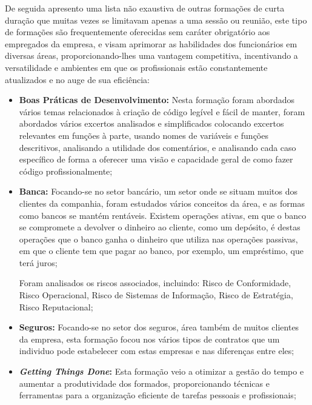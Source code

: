       De seguida apresento uma lista não exaustiva de outras formações de curta duração que muitas vezes se limitavam apenas a uma sessão ou reunião, este tipo de formações são frequentemente oferecidas sem caráter obrigatório aos empregados da empresa, e visam aprimorar as habilidades dos funcionários em diversas áreas, proporcionando-lhes uma vantagem competitiva, incentivando a versatilidade e ambientes em que os profissionais estão constantemente atualizados e no auge de sua eficiência:

    \begin{itemize}
      \item \textbf{Boas Práticas de Desenvolvimento:} Nesta formação foram abordados vários temas relacionados à criação de código legível e fácil de manter, foram abordados vários excertos analisados e simplificados colocando excertos relevantes em funções à parte, usando nomes de variáveis e funções descritivos, analisando a utilidade dos comentários, e analisando cada caso específico de forma a oferecer uma visão e capacidade geral de como fazer código profissionalmente;
      
      \item \textbf{Banca:} Focando-se no setor bancário, um setor onde se situam muitos dos clientes da companhia, foram estudados vários conceitos da área, e as formas como bancos se mantém rentáveis.
      Existem operações ativas, em que o banco se compromete a devolver o dinheiro ao cliente, como um depósito, é destas operações que o banco ganha o dinheiro que utiliza nas operações passivas, em que o cliente tem que pagar ao banco, por exemplo, um empréstimo, que terá juros;

      Foram analisados os riscos associados, incluindo: Risco de Conformidade, Risco Operacional, Risco de Sistemas de Informação, Risco de Estratégia, Risco Reputacional;
              
      \item \textbf{Seguros:} Focando-se no setor dos seguros, área também de muitos clientes da empresa, esta formação focou nos vários tipos de contratos que um individuo pode estabelecer com estas empresas e nas diferenças entre eles;
      
      \item \textbf{\textit{Getting Things Done}:} Esta formação veio a otimizar a gestão do tempo e aumentar a produtividade dos formados, proporcionando técnicas e ferramentas para a organização eficiente de tarefas pessoais e profissionais;
      

\end{itemize}
